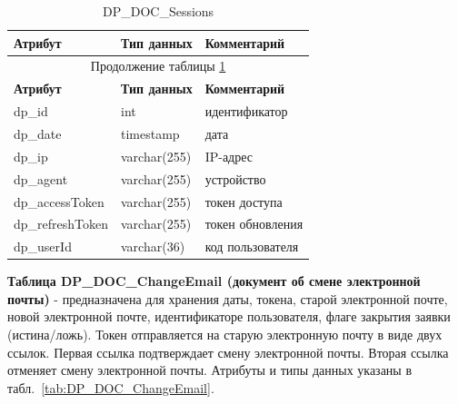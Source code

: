 \begin{longtable}{|p{5.5cm}|p{3.5cm}|p{7.5cm}|}
    \caption{DP\_DOC\_Sessions} \label{tab:DP_DOC_Sessions} \\
    \hline
    \textbf{Атрибут} & \textbf{Тип данных} & \textbf{Комментарий} \\ \hline
    \endfirsthead

    \multicolumn{3}{c}{Продолжение таблицы \ref{tab:DP_DOC_Sessions}} \\
    \hline
    \textbf{Атрибут} & \textbf{Тип данных} & \textbf{Комментарий} \\ \hline
    \endhead

    \endfoot

    \endlastfoot
    dp\_id & int & идентификатор \\ \hline
    dp\_date & timestamp & дата \\ \hline
    dp\_ip & varchar(255) & IP-адрес \\ \hline
    dp\_agent & varchar(255) & устройство \\ \hline
    dp\_accessToken & varchar(255) & токен доступа \\ \hline
    dp\_refreshToken & varchar(255) & токен обновления \\ \hline
    dp\_userId & varchar(36) & код пользователя \\ \hline
\end{longtable}

\textbf{Таблица DP\_DOC\_ChangeEmail (документ об смене электронной почты)} -
предназначена для хранения даты, токена, старой электронной почте, новой электронной почте,
идентификаторе пользователя, флаге закрытия заявки (истина/ложь).
Токен отправляется на старую электронную почту в виде двух ссылок.
Первая ссылка подтверждает смену электронной почты.
Вторая ссылка отменяет смену электронной почты.
Атрибуты и типы данных указаны в табл.~\ref{tab:DP_DOC_ChangeEmail}.

